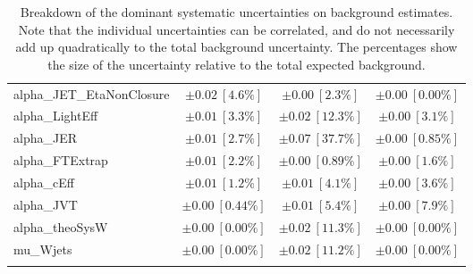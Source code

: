 \begin{sidewaystable}
\begin{center}
\begin{tabular*}{\textwidth}{@{\extracolsep{\fill}}lccc}
alpha\_JET\_EtaNonClosure         & $\pm 0.02\ [4.6\%] $          & $\pm 0.00\ [2.3\%] $          & $\pm 0.00\ [0.00\%] $       \\
alpha\_LightEff         & $\pm 0.01\ [3.3\%] $          & $\pm 0.02\ [12.3\%] $          & $\pm 0.00\ [3.1\%] $       \\
alpha\_JER         & $\pm 0.01\ [2.7\%] $          & $\pm 0.07\ [37.7\%] $          & $\pm 0.00\ [0.85\%] $       \\
alpha\_FTExtrap         & $\pm 0.01\ [2.2\%] $          & $\pm 0.00\ [0.89\%] $          & $\pm 0.00\ [1.6\%] $       \\
alpha\_cEff         & $\pm 0.01\ [1.2\%] $          & $\pm 0.01\ [4.1\%] $          & $\pm 0.00\ [3.6\%] $       \\
alpha\_JVT         & $\pm 0.00\ [0.44\%] $          & $\pm 0.01\ [5.4\%] $          & $\pm 0.00\ [7.9\%] $       \\
alpha\_theoSysW         & $\pm 0.00\ [0.00\%] $          & $\pm 0.02\ [11.3\%] $          & $\pm 0.00\ [0.00\%] $       \\
mu\_Wjets         & $\pm 0.00\ [0.00\%] $          & $\pm 0.02\ [11.2\%] $          & $\pm 0.00\ [0.00\%] $       \\
\noalign{\smallskip}\hline\noalign{\smallskip}
\end{tabular*}
\end{center}
\caption[Breakdown of uncertainty on background estimates]{
Breakdown of the dominant systematic uncertainties on background estimates.
Note that the individual uncertainties can be correlated, and do not necessarily add up quadratically to 
the total background uncertainty. The percentages show the size of the uncertainty relative to the total expected background.
\label{table.results.bkgestimate.uncertainties.SRC6_bybkg}}
\end{sidewaystable}
%
